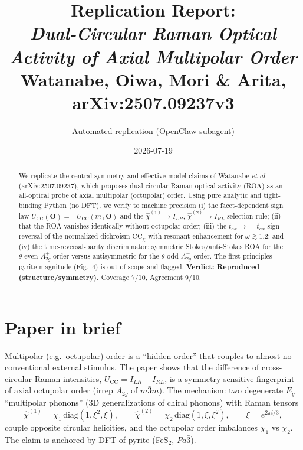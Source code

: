 \documentclass[11pt]{article}
\title{Replication Report: \\ \emph{Dual-Circular Raman Optical Activity of Axial Multipolar Order} \\ {\large Watanabe, Oiwa, Mori \& Arita, arXiv:2507.09237v3}}
\author{Automated replication (OpenClaw subagent)}
\date{2026-07-19}
\newcommand{\UCC}{U_{\mathrm{CC}}}
\newcommand{\CCchi}{\mathrm{CC}_\chi}
\begin{document}
\maketitle

\begin{abstract}
We replicate the central symmetry and effective-model claims of Watanabe \emph{et al.}
(arXiv:2507.09237), which proposes dual-circular Raman optical activity (ROA) as an
all-optical probe of axial multipolar (octupolar) order. Using pure analytic and
tight-binding Python (no DFT), we verify to machine precision (i) the facet-dependent
sign law $\UCC(\mathbf{O})=-\UCC(m_\perp\mathbf{O})$ and the $\hat\chi^{(1)}\!\to\!I_{LR}$,
$\hat\chi^{(2)}\!\to\!I_{RL}$ selection rule; (ii) that the ROA vanishes identically
without octupolar order; (iii) the $t_{ax}\!\to\!-t_{ax}$ sign reversal of the normalized
dichroism $\CCchi$ with resonant enhancement for $\omega\gtrsim1.2$; and (iv) the
time-reversal-parity discriminator: symmetric Stokes/anti-Stokes ROA for the $\theta$-even
$A_{2g}^+$ order versus antisymmetric for the $\theta$-odd $A_{2g}^-$ order. The
first-principles pyrite magnitude (Fig.~4) is out of scope and flagged. \textbf{Verdict:
Reproduced (structure/symmetry).} Coverage 7/10, Agreement 9/10.
\end{abstract}

\section{Paper in brief}
Multipolar (e.g.\ octupolar) order is a ``hidden order'' that couples to almost no
conventional external stimulus. The paper shows that the difference of cross-circular
Raman intensities, $\UCC=I_{LR}-I_{RL}$, is a symmetry-sensitive fingerprint of axial
octupolar order (irrep $A_{2g}$ of $m\bar3m$). The mechanism: two degenerate $E_g$
``multipolar phonons'' (3D generalizations of chiral phonons) with Raman tensors
\begin{equation}
\hat\chi^{(1)}=\chi_1\,\mathrm{diag}(1,\xi^2,\xi),\qquad
\hat\chi^{(2)}=\chi_2\,\mathrm{diag}(1,\xi,\xi^2),\qquad \xi=e^{2\pi i/3},
\label{eq:tensors}
\end{equation}
couple opposite circular helicities, and the octupolar order imbalances $\chi_1$ vs
$\chi_2$. The claim is anchored by DFT of pyrite (FeS$_2$, $Pa\bar3$).
\end{document}
